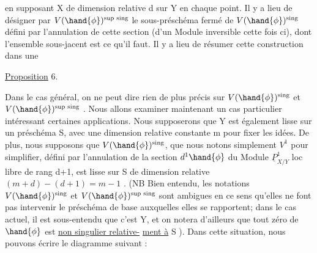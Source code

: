 
en supposant X de dimension relative d sur Y en chaque point.  Il y a
lieu de  désigner par  $V(\hand{\phi})^{\text{sup sing}}$ le sous-préschéma fermé de
 $V(\hand{\phi})^{\text{sing}}$  défini par l'annulation de cette section (d'un Module
inversible cette fois ci),  dont l'ensemble  sous-jacent est ce qu'il
faut. Il y a lieu de résumer cette construction dans une

\uline{Proposition} 6.

Dans le cas général, on ne peut  dire rien de plus précis sur
$V(\hand{\phi})^{\text{sing}}$ et $V(\hand{\phi})^{\text{sup sing}}$ .  Nous allons  examiner maintenant un cas
particulier\hand{,} intéressant  certaines applications. Nous supposerons
que Y est également lisse sur un préschéma S, avec une dimension relative
constante m pour fixer les idées.  De plus, nous supposons que $V(\hand{\phi})^{\text{sing}}$,
que nous notons simplement $V^1$ pour simplifier, défini  par l'annulation
de la section $d^1\hand{\phi}$  du Module $\underline{P}^1_{X/Y}$  loc libre de  rang d+1,
est  lisse sur S de dimension relative  $(m+d) - (d+1) = m-1$ . (NB  Bien
entendu, les notations $V(\hand{\phi})^{\text{sing}}$ et $V(\hand{\phi})^{\text{sup sing}}$ sont ambigues en ce sens
qu'elles ne font pas intervenir le préschéma de base  auxquelles elles
se rapportent; dans le cas actuel,  il est sous-entendu que c'est Y,
et on notera d'ailleurs  que tout zéro de $\hand{\phi}$  est \uline{non singulier relative-}%
\uline{ment à} S ).  Dans cette situation, nous pouvons écrire  le diagramme
suivant  :

